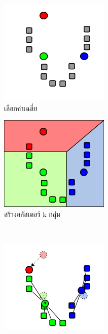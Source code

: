 \begin{figure}[H]
    \centering
    \begin{subfigure}{0.4\textwidth}
        \centering
        \includegraphics[width=0.5\linewidth]{fig/k-means-step1.png}
        \caption{เลือกค่าเฉลี่ย}
        \label{fig:k_means_step1}
    \end{subfigure}%
    \begin{subfigure}{0.4\textwidth}
        \centering
        \includegraphics[width=0.5\linewidth]{fig/k-means-step2.png}
        \caption{สร้างคลัสเตอร์ k กลุ่ม}
        \label{fig:k_means_step2}
    \end{subfigure}
    \\
    \vspace{1em}
    \begin{subfigure}{0.4\textwidth}
        \centering
        \includegraphics[width=0.5\linewidth]{fig/k-means-step3.png}

\end{subfigure}
\end{figure}
